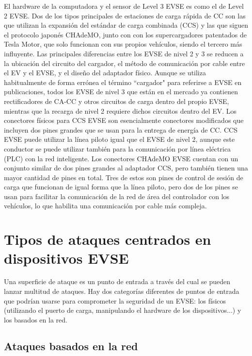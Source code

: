 \documentclass[12pt,a4paper,onecolumn,oneside]{report}
\begin{document}
El hardware de la computadora y el sensor de Level 3 EVSE es como el de Level 2 EVSE. Dos de los tipos principales de estaciones de carga rápida de CC son las que utilizan la expansión del estándar de carga combinada (CCS) y las que siguen el protocolo japonés CHAdeMO, junto con con los supercargadores patentados de Tesla Motor, que solo funcionan con sus propios vehículos, siendo el tercero más influyente. Las principales diferencias entre los EVSE de nivel 2 y 3 se reducen a la ubicación del circuito del cargador, el método de comunicación por cable entre el EV y el EVSE, y el diseño del adaptador físico. Aunque se utiliza habitualmente de forma errónea el término ``cargador" para referirse a EVSE en publicaciones, todos los EVSE de nivel 3 que están en el mercado ya contienen rectificadores de CA-CC y otros circuitos de carga dentro del propio EVSE, mientras que la recarga de nivel 2 requiere dichos circuitos dentro del EV. Los conectores físicos para CCS EVSE son esencialmente conectores modificados que incluyen dos pines grandes que se usan para la entrega de energía de CC. CCS EVSE puede utilizar la línea piloto igual que el EVSE de nivel 2, aunque este conductor se puede utilizar también para la comunicación por línea eléctrica (PLC) con la red inteligente. Los conectores CHAdeMO EVSE cuentan con un conjunto similar de dos pines grandes al adaptador CCS, pero también tienen una mayor cantidad de pines en total. Tres de estos son pines de control de sesión de carga que funcionan de igual forma que la línea piloto, pero dos de los pines se usan para facilitar la comunicación de la red de área del controlador con los vehículos, lo que habilita una comunicación por cable más compleja.

\section{Tipos de ataques centrados en dispositivos EVSE}
\label{Tipos de ataques centrados en dispositivos EVSE}

Una superficie de ataque es un punto de entrada a través del cual se pueden lanzar multitud de ataques. Hay dos categorías diferentes de puntos de entrada que podrían usarse para comprometer la seguridad de un EVSE: los físicos (utilizando el puerto de carga, manipulando el hardware de los dispositivos...) y los basados en la red.


\subsection{Ataques basados en la red}
\end{document}
